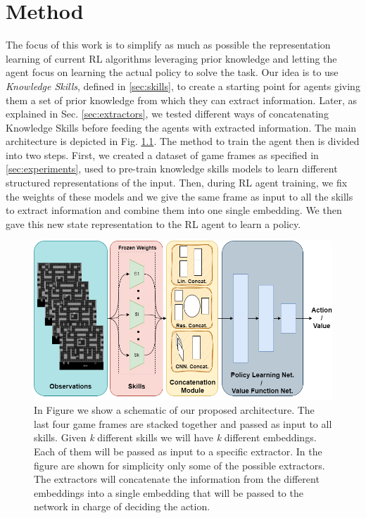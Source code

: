 
\chapter{Method}
\label{sec:method}


The focus of this work is to simplify as much as possible the representation learning of current RL algorithms leveraging prior knowledge and letting the agent focus on learning the actual policy to solve the task. Our idea is to use \textit{Knowledge Skills}, defined in \ref{sec:skills}, to create a starting point for agents giving them a set of prior knowledge from which they can extract information. Later, as explained in Sec. \ref{sec:extractors}, we tested different ways of concatenating Knowledge Skills before feeding the agents with extracted information.
The main architecture is depicted in Fig. \ref{fig:main_architecture}.
The method to train the agent then is divided into two steps.
First, we created a dataset of game frames as specified in \ref{sec:experiments}, used to pre-train knowledge skills models to learn different structured representations of the input. Then, during RL agent training, we fix the weights of these models and we give the same frame as input to all the skills to extract information and combine them into one single embedding. We then gave this new state representation to the RL agent to learn a policy.

\begin{figure}[ht]
    \begin{center}
        \includegraphics[width=\textwidth]{images/main_architecture.png}
    \end{center}
    \caption{In Figure we show a schematic of our proposed architecture. The last four game frames are stacked together and passed as input to all skills.  Given \textit{k} different skills we will have \textit{k} different embeddings. Each of them will be passed as input to a specific extractor. In the figure are shown for simplicity only some of the possible extractors. The extractors will concatenate the information from the different embeddings into a single embedding that will be passed to the network in charge of deciding the action.}
    \label{fig:main_architecture}
\end{figure}

